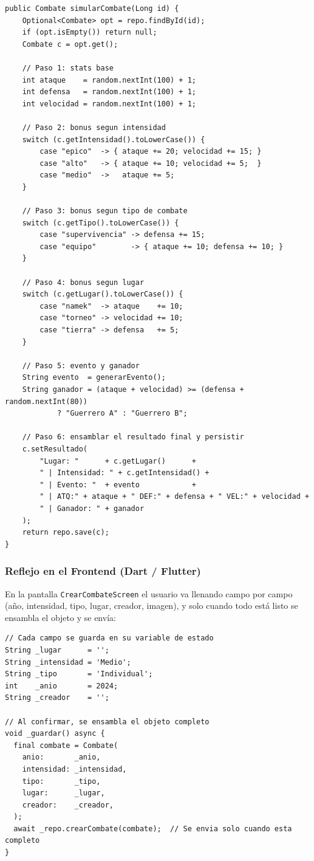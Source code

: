 \documentclass{article}
\begin{document}
\begin{lstlisting}[style=javaStyle, caption={Construcci\'on incremental del resultado en CombateService (service/CombateService.java)}]
public Combate simularCombate(Long id) {
    Optional<Combate> opt = repo.findById(id);
    if (opt.isEmpty()) return null;
    Combate c = opt.get();
 
    // Paso 1: stats base
    int ataque    = random.nextInt(100) + 1;
    int defensa   = random.nextInt(100) + 1;
    int velocidad = random.nextInt(100) + 1;
 
    // Paso 2: bonus segun intensidad
    switch (c.getIntensidad().toLowerCase()) {
        case "epico"  -> { ataque += 20; velocidad += 15; }
        case "alto"   -> { ataque += 10; velocidad += 5;  }
        case "medio"  ->   ataque += 5;
    }
 
    // Paso 3: bonus segun tipo de combate
    switch (c.getTipo().toLowerCase()) {
        case "supervivencia" -> defensa += 15;
        case "equipo"        -> { ataque += 10; defensa += 10; }
    }
 
    // Paso 4: bonus segun lugar
    switch (c.getLugar().toLowerCase()) {
        case "namek"  -> ataque    += 10;
        case "torneo" -> velocidad += 10;
        case "tierra" -> defensa   += 5;
    }
 
    // Paso 5: evento y ganador
    String evento  = generarEvento();
    String ganador = (ataque + velocidad) >= (defensa + random.nextInt(80))
            ? "Guerrero A" : "Guerrero B";
 
    // Paso 6: ensamblar el resultado final y persistir
    c.setResultado(
        "Lugar: "      + c.getLugar()      +
        " | Intensidad: " + c.getIntensidad() +
        " | Evento: "  + evento            +
        " | ATQ:" + ataque + " DEF:" + defensa + " VEL:" + velocidad +
        " | Ganador: " + ganador
    );
    return repo.save(c);
}
\end{lstlisting}
 
\subsubsection*{Reflejo en el Frontend (Dart / Flutter)}
 
En la pantalla \texttt{CrearCombateScreen} el usuario va llenando campo por
campo (a\~no, intensidad, tipo, lugar, creador, imagen), y solo cuando todo
est\'a listo se ensambla el objeto y se env\'ia:
 
\begin{lstlisting}[style=dartStyle, caption={Construcci\'on incremental del Combate en el formulario (screens/crear\_combate\_screen.dart -- fragmento)}]
// Cada campo se guarda en su variable de estado
String _lugar      = '';
String _intensidad = 'Medio';
String _tipo       = 'Individual';
int    _anio       = 2024;
String _creador    = '';
 
// Al confirmar, se ensambla el objeto completo
void _guardar() async {
  final combate = Combate(
    anio:       _anio,
    intensidad: _intensidad,
    tipo:       _tipo,
    lugar:      _lugar,
    creador:    _creador,
  );
  await _repo.crearCombate(combate);  // Se envia solo cuando esta completo
}
\end{lstlisting}
 
\end{document}
